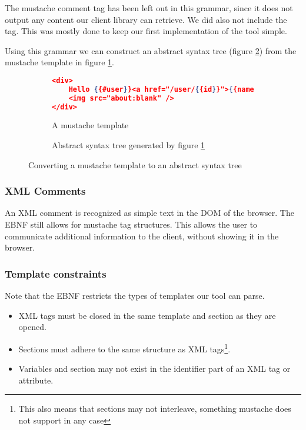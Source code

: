 \documentclass[thesis.tex]{subfiles}
\begin{document}
The mustache comment tag has been left out in this grammar, since it does not
output any content our client library can retrieve. We did also not include the
 tag. This was mostly done to keep our first
implementation of the tool simple.

Using this grammar we can construct an abstract syntax tree
(figure \ref{fig:ast.ast}) from the mustache template in figure
\ref{fig:ast.mustache}.

\begin{figure}
	\centering
	\begin{subfigure}{\linewidth}
		\caption{A mustache template}
		\label{fig:ast.mustache}
		\begin{lstlisting}[language=JSON]
<div>
	Hello {{#user}}<a href="/user/{{id}}">{{name}}</a>{{/user}}
	<img src="about:blank" />
</div>
		\end{lstlisting}
	\end{subfigure}
	
	\begin{subfigure}{\linewidth}
		\caption{Abstract syntax tree generated by figure \ref{fig:ast.mustache}}
		\label{fig:ast.ast}
		\resizebox{\linewidth}{!}{}
	\end{subfigure}
	\caption{Converting a mustache template to an abstract syntax tree}
	\label{fig:ast}
\end{figure}

\subsubsection{XML Comments}
An XML comment is recognized as simple text in the DOM of the browser. The EBNF
still allows for mustache tag structures. This allows the user to communicate
additional information to the client, without showing it in the browser.

\subsubsection{Template constraints}
\label{sec:template-constraints}
Note that the EBNF restricts the types of
templates our tool can parse.

\begin{itemize}
\item XML tags must be closed in the same template and section as they are opened.
\item Sections must adhere to the same structure as XML tags\footnote{
      This also means that sections may not interleave, something mustache
      does not support in any case}.
\item Variables and section may not exist in the identifier part of an XML tag
      or attribute.
\end{itemize}
\end{document}
